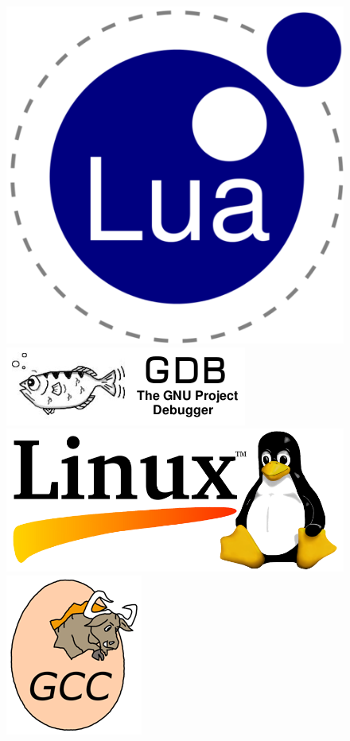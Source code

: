 \documentclass[11pt]{article} %
\begin{document}
\begin{figure}[tb]
\begin{center}
  \includegraphics[scale=0.15]{res/lua.png} \quad
  \includegraphics[scale=0.4]{res/GDB.png} \quad
  \includegraphics[scale=0.16]{res/linux.png} \quad
  \includegraphics[scale=0.35]{res/GCC.png} \quad

\end{center}
\end{figure}
\end{document}
